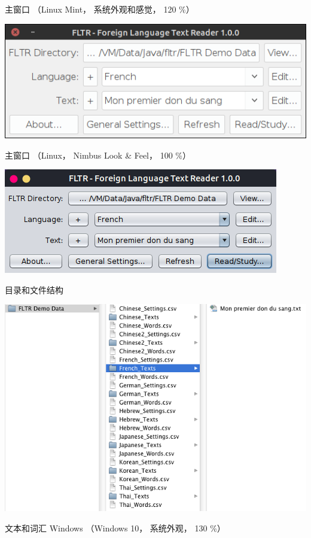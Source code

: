 \documentclass[cn,10pt,math=newtx,citestyle=gb7714-2015,bibstyle=gb7714-2015]{elegantbook}
\begin{document}
主窗口 （Linux Mint， 系统外观和感觉， 120 \%）

\includegraphics[scale=0.8]{image/images-007.png}


主窗口 （Linux， Nimbus Look \& Feel， 100 \%）

\includegraphics[scale=0.8]{image/images-009.png}


目录和文件结构

\includegraphics[scale=0.5]{image/images-011.png}

文本和词汇 Windows （Windows 10， 系统外观， 130 \%）
\end{document}
